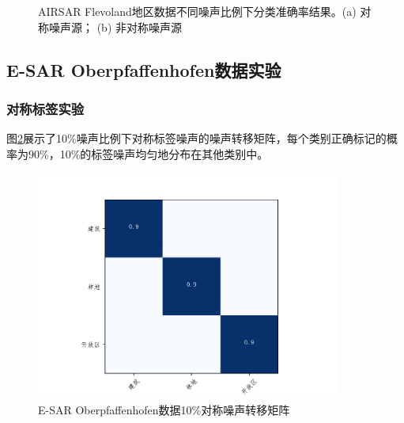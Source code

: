 \begin{figure}[ht!]
  \caption{AIRSAR Flevoland地区数据不同噪声比例下分类准确率结果。(a) 对称噪声源； (b) 非对称噪声源}
  \label{fig:fle_noise}
\end{figure}

\subsection{E-SAR Oberpfaffenhofen数据实验}
\subsubsection{对称标签实验}
图\ref{fig:ober_noise_uniform}展示了10\%噪声比例下对称标签噪声的噪声转移矩阵，每个类别正确标记的概率为90\%，10\%的标签噪声均匀地分布在其他类别中。
\begin{figure}[ht!]
  \centering
  \includegraphics[width=10.04cm]{pic/chapter4/ober/noise_uniform.pdf}
  \caption{E-SAR Oberpfaffenhofen数据10\%对称噪声转移矩阵}
  \label{fig:ober_noise_uniform}
\end{figure}

